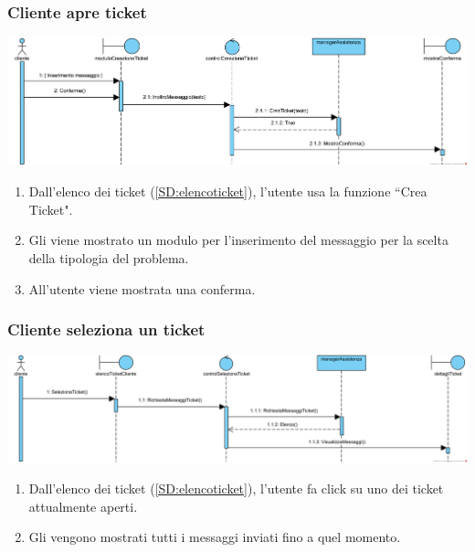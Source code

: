 \documentclass[12pt,a4paper]{article}
\begin{document}
\subsubsection{Cliente apre ticket}
\label{SD:aperturaticket}

\begin{center}
\includegraphics[clip,width=\textwidth]{SequenceDiagram/ClienteTicketCreazione}
\end{center}

\begin{enumerate}
\item Dall'elenco dei ticket (\ref{SD:elencoticket}), l'utente usa la funzione ``Crea Ticket".
\item Gli viene mostrato un modulo per l'inserimento del messaggio per la scelta della tipologia del problema.
\item All'utente viene mostrata una conferma.
\end{enumerate}

\subsubsection{Cliente seleziona un ticket}
\label{SD:selezioneticketcliente}

\begin{center}
\includegraphics[width=\textwidth]{SequenceDiagram/ClienteTicketSeleziona}
\end{center}

\begin{enumerate}
\item Dall'elenco dei ticket (\ref{SD:elencoticket}), l'utente fa click su uno dei ticket attualmente aperti.
\item Gli vengono mostrati tutti i messaggi inviati fino a quel momento.
\end{enumerate}
\end{document}
